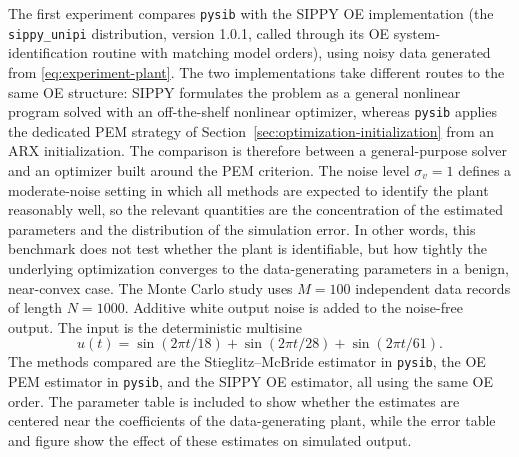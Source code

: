 \documentclass{ifacconf}
\begin{document}
The first experiment compares \texttt{pysib} with the SIPPY OE implementation
\citep{sippy} (the \texttt{sippy\_unipi} distribution, version 1.0.1, called
through its OE system-identification routine with matching model orders), using
noisy data generated from
\eqref{eq:experiment-plant}.  The two implementations take different routes to
the same OE structure: SIPPY formulates the problem as a general nonlinear
program solved with an off-the-shelf nonlinear optimizer, whereas \texttt{pysib}
applies the dedicated PEM strategy of
Section~\ref{sec:optimization-initialization} from an ARX initialization.  The
comparison is therefore between a general-purpose solver and an optimizer built
around the PEM criterion.  The noise level
\(\sigma_v=1\) defines a moderate-noise setting in which all methods are expected
to identify the plant reasonably well, so the relevant quantities are the
concentration of the estimated parameters and the distribution of the simulation
error.  In other words, this benchmark does not test whether the plant is
identifiable, but how tightly the underlying optimization converges to the
data-generating parameters in a benign, near-convex case.  The Monte Carlo study uses \(M=100\) independent data records of length
\(N=1000\).  Additive white output noise is added to the noise-free output.  The
input is the deterministic multisine
\begin{equation}
  u(t)=\sin(2\pi t/18)+\sin(2\pi t/28)+\sin(2\pi t/61).
  \label{eq:noisy-input}
\end{equation}
The methods compared are the Stieglitz--McBride estimator in \texttt{pysib}, the
OE PEM estimator in \texttt{pysib}, and the SIPPY OE estimator, all using the
same OE order.  The parameter table is included to show whether the estimates
are centered near the coefficients of the data-generating plant, while the error
table and figure show the effect of these estimates on simulated output.
\end{document}
